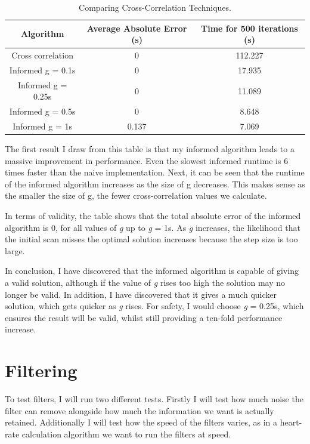\documentclass[12pt,a4paper,twoside,openright]{report}
\begin{document}
\begin{table}
\centering
\caption{Comparing Cross-Correlation Techniques.}
\label{table:cross-correlation}
\begin{tabular}{ | c | c | c | }
	\hline
	Algorithm & Average Absolute Error (s) & Time for 500
	iterations (s)\\ 
	\hline
	Cross correlation & 0 & 112.227 \\  
	Informed g = 0.1s & 0 & 17.935 \\    
	Informed g = 0.25s & 0 & 11.089 \\    
	Informed g = 0.5s & 0 & 8.648 \\    
	Informed g = 1s & 0.137 & 7.069  \\
	\hline
   \end{tabular}
\end{table}

The first result I draw from this table is that my informed algorithm leads to
a massive improvement in performance. Even the slowest informed runtime is 6
times faster than the naive implementation. Next, it can be seen that the
runtime of the informed algorithm increases as the size of g decreases. This
makes sense as the smaller the size of g, the fewer cross-correlation values
we calculate.

In terms of validity, the table shows that the total absolute error of the
informed algorithm is 0, for all values of \emph{g} up to \emph{g} = 1s. As
\emph{g} increases, the likelihood that the initial scan misses the optimal
solution increases because the step size is too large. 

In conclusion, I have discovered that the informed algorithm is capable of
giving a valid solution, although if the value of \emph{g} rises too high the
solution may no longer be valid. In addition, I have discovered that it gives
a much quicker solution, which gets quicker as \emph{g} rises. For safety, I
would choose \emph{g} = 0.25s, which ensures the result will be valid, whilst
still providing a ten-fold performance increase.


\section{Filtering}

To test filters, I will run two different tests. Firstly I will test how much
noise the filter can remove alongside how much the information we want is
actually retained. Additionally
I will test how the speed of the filters
varies, as in a heart-rate calculation algorithm we want to run the filters at
speed.
\end{document}
